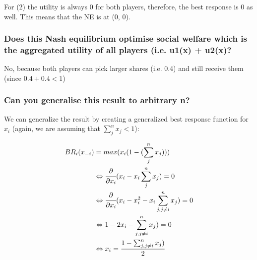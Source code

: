 For (2) the utility is always $0$ for both players, therefore, the best response is 0 as well. This means that the NE is at (0, 0).

\subsubsection{Does this Nash equilibrium optimise social welfare which is the aggregated utility of all players (i.e. u1(x) + u2(x)?}

No, because both players can pick larger shares (i.e. 0.4) and still receive them (since $0.4 + 0.4 < 1$)

\subsubsection{Can you generalise this result to arbitrary n?}
We can generalize the result by creating a generalized best response function for $x_i$ (again, we are assuming that $\sum_{j}^{n} x_j < 1$):

\begin{equation}
    \begin{split}
        BR_i(x_{-i})&=max(x_i(1 - (\sum_{j}^{n} x_j)))\\
        &\Leftrightarrow \cfrac{\partial}{\partial x_i}(x_i - x_i \sum_{j}^{n} x_j)=0\\
        &\Leftrightarrow \cfrac{\partial}{\partial x_i}(x_i - x_i^2 - x_i \sum_{j,j\neq i}^{n} x_j)=0\\
        &\Leftrightarrow 1-2x_i - \sum_{j,j\neq i}^{n} x_j)=0\\
        &\Leftrightarrow x_i = \frac{1-\sum_{j,j\neq i}^{n} x_j)}{2}\\
    \end{split}
\end{equation}
